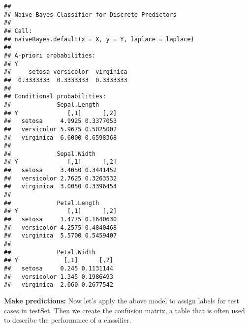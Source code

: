 \documentclass[]{article}
\newenvironment{Shaded}{\begin{snugshade}}{\end{snugshade}}
\newcommand{\CommentTok}[1]{\textcolor[rgb]{0.56,0.35,0.01}{\textit{#1}}}
\newcommand{\DataTypeTok}[1]{\textcolor[rgb]{0.13,0.29,0.53}{#1}}
\newcommand{\KeywordTok}[1]{\textcolor[rgb]{0.13,0.29,0.53}{\textbf{#1}}}
\newcommand{\NormalTok}[1]{#1}
\newcommand{\OperatorTok}[1]{\textcolor[rgb]{0.81,0.36,0.00}{\textbf{#1}}}
\newcommand{\StringTok}[1]{\textcolor[rgb]{0.31,0.60,0.02}{#1}}
\begin{document}
\begin{verbatim}
## 
## Naive Bayes Classifier for Discrete Predictors
## 
## Call:
## naiveBayes.default(x = X, y = Y, laplace = laplace)
## 
## A-priori probabilities:
## Y
##     setosa versicolor  virginica 
##  0.3333333  0.3333333  0.3333333 
## 
## Conditional probabilities:
##             Sepal.Length
## Y              [,1]      [,2]
##   setosa     4.9925 0.3377053
##   versicolor 5.9675 0.5025002
##   virginica  6.6000 0.6598368
## 
##             Sepal.Width
## Y              [,1]      [,2]
##   setosa     3.4050 0.3441452
##   versicolor 2.7625 0.3263532
##   virginica  3.0050 0.3396454
## 
##             Petal.Length
## Y              [,1]      [,2]
##   setosa     1.4775 0.1640630
##   versicolor 4.2575 0.4840468
##   virginica  5.5700 0.5459407
## 
##             Petal.Width
## Y             [,1]      [,2]
##   setosa     0.245 0.1131144
##   versicolor 1.345 0.1986493
##   virginica  2.060 0.2677542
\end{verbatim}

\textbf{Make predictions:} Now let's apply the above model to assign
labels for test cases in testSet. Then we create the confusion matrix, a
table that is often used to describe the performance of a classifier.

\begin{Shaded}
\end{Shaded}
\end{document}
